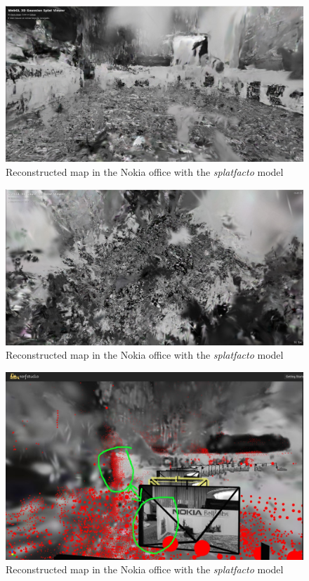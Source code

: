 \begin{figure}[htbp]
	\centering
	\includegraphics[width=150mm, keepaspectratio]{figures_jpg/nokia_splatfacto_ours1.jpg}
	\caption{Reconstructed map in the Nokia office with the \textit{splatfacto} model}
	\label{fig:nokia_splatfacto_ours_1}
\end{figure}

\begin{figure}[htbp]
	\centering
	\includegraphics[width=150mm, keepaspectratio]{figures_jpg/nokia_splatfacto_ours2.jpg}
	\caption{Reconstructed map in the Nokia office with the \textit{splatfacto} model}
	\label{fig:nokia_splatfacto_ours_2}
\end{figure}

\begin{figure}[htbp]
	\centering
	\includegraphics[width=150mm, keepaspectratio]{figures_jpg/trajectory_and_pointcloud_debug.jpg}
	\caption{Reconstructed map in the Nokia office with the \textit{splatfacto} model}
	\label{fig:trajectory_and_pointcloud}
\end{figure}

